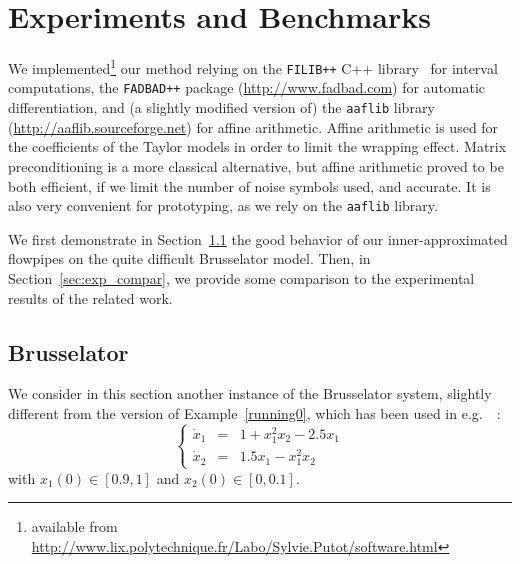 \documentclass{sig-alternate-05-2015}
\newcommand{\addTODO}[1]{\addcontentsline{tdo}{toc}{#1}}
\newcommand{\TODO}[1]{{\bf{\scriptsize #1}\addTODO{#1}}}
\newcommand{\EG}[1]{\TODO{Eric : #1}}
\begin{document}
\section{Experiments and Benchmarks}
\label{sec:experiments}
We implemented\footnote{available from \url{http://www.lix.polytechnique.fr/Labo/Sylvie.Putot/software.html}}{} our method relying on the {\tt FILIB++} C++ library~\cite{filib} for 
interval computations, the {\tt FADBAD++} package (\url{http://www.fadbad.com}) for automatic differentiation, and (a slightly modified version of)
the {\tt aaflib} library 
(\url{http://aaflib.sourceforge.net}) for affine arithmetic. Affine arithmetic is used for the
coefficients of the Taylor models in order to limit the wrapping effect. Matrix preconditioning is a more classical alternative,
but affine arithmetic proved to be both efficient, if we limit the number of noise symbols used, and accurate. 
It is also very convenient for prototyping, as we rely on the {\tt aaflib} library.


We first demonstrate in Section~\ref{sec:exp_bruss} the good behavior of our inner-approximated flowpipes
 on the quite difficult Brusselator model. %
Then, in Section~\ref{sec:exp_compar}, we provide some comparison to the experimental results 
of the related work. 
 
\subsection{Brusselator}
\label{sec:exp_bruss}

We consider in this section another instance of the Brusselator system, slightly different  from the version of  Example~\ref{running0}, 
which has been used in e.g.~\cite{Underapproxflowpipes,underapprox16}~: 
$$\left\{\begin{array}{rcl}
\dot{x}_1 & = & 1+x_1^2x_2-2.5x_1 \\
\dot{x}_2 & = & 1.5x_1-x_1^2x_2
\end{array}\right.$$
\noindent with $x_1(0) \in [0.9,1]$ and $x_2(0) \in [0,0.1]$.
\end{document}
